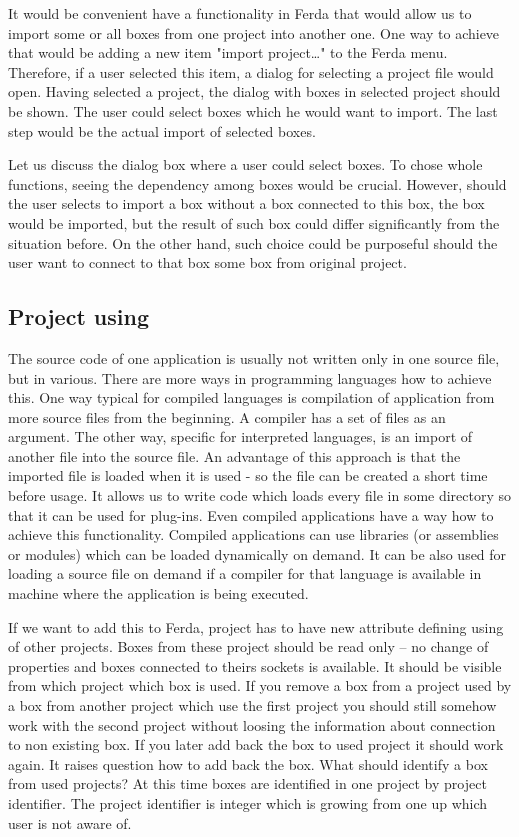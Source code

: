 \documentclass[a4paper,12pt]{book}
\begin{document}
It would be convenient have a functionality in Ferda that would allow us to import some or all boxes from one project into another one. One way to achieve that would be adding a new item "import project\dots" to the Ferda menu. Therefore, if a user selected this item, a dialog for selecting a project file would open. Having selected a project, the dialog with boxes in selected project should be shown. The user could select boxes which he would want to import. The last step would be the actual import of selected boxes.

Let us discuss the dialog box where a user could select boxes. To chose whole functions, seeing the dependency among boxes would be crucial. However, should the user selects to import a box without a box connected to this box, the box would be imported, but the result of such box could differ significantly from the situation before. On the other hand, such choice could be purposeful should the user want to connect to that box some box from original project.


\subsection{Project using}
The source code of one application is usually not written only in one source file, but in various. There are more ways in programming languages how to achieve this. One way typical for compiled languages is compilation of application from more source files from the beginning. A compiler has a set of files as an argument. The other way, specific for interpreted languages, is an import of another file into the source file. An advantage of this approach is that the imported file is loaded when it is used - so the file can be created a short time before usage. It allows us to write code which loads every file in some directory so that it can be used for plug-ins. Even compiled applications have a way how to achieve this functionality. Compiled applications can use libraries (or assemblies or modules) which can be loaded dynamically on demand. It can be also used for loading a source file on demand if a compiler for that language is available in machine where the application is being executed.

If we want to add this to Ferda, project has to have new attribute defining using of other projects. Boxes from these project should be read only -- no change of properties and boxes connected to theirs sockets is available. It should be visible from which project which box is used. If you remove a box from a project used by a box from another project which use the first project you should still somehow work with the second project without loosing the information about connection to non existing box. If you later add back the box to used project it should work again. It raises question how to add back the box. What should identify a box from used projects? At this time boxes are identified in one project by project identifier. The project identifier is integer which is growing from one up which user is not aware of.
\end{document}
